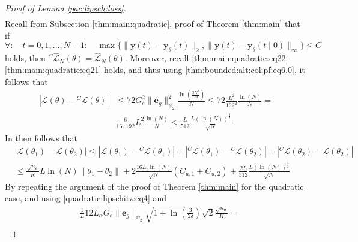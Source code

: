 \documentclass{article}
\newcommand{\e}{\mathbf{e}}
\newcommand{\y}{\mathbf{y}}
\begin{document}
\begin{proof}[Proof of Lemma \ref{pac:lipsch:loss}]
\begin{align*}
    \end{align*}
    Recall from Subsection \ref{thm:main:quadratic}, proof of Theorem \ref{thm:main} that 
    if 
    \[
         \forall: \quad   t=0,1,\ldots,N-1: \quad  \max\{\|\y(t)-\y_{\theta}(t)\|_2, \|\y(t)-\y_{\theta}(t \mid 0)\|_\infty\} \le C
    \]
   holds, then ${}^C \hat{\mathcal{L}}_N(\theta)=\hat{\mathcal{L}}_N(\theta)$.
   Moreover, recall \eqref{thm:main:quadratic:eq22}-\eqref{thm:main:quadratic:eq21} holds, and thus
   using \eqref{thm:bounded:alt:col:pf:eq6.0}, it follows that
   \begin{equation}
  \label{quadratic:lipschitz:eq04}
   \begin{aligned}
       \left|\mathcal{L}(\theta)-{}^C\mathcal{L}(\theta)\right| & \le 72G_e^2\|\e_g\|_{\psi_2}^2\frac{\ln\left(\frac{3N^2}{2\delta}\right)}{N} \le 72 \frac{L^2}{192^2} \frac{\ln(N)}{N} = \\
       & \frac{6}{16 \cdot 192} L^2 \frac{\ln(N)}{N} \le  \frac{L}{512} \frac{L(\ln(N))^{\frac{3}{2}}}{\sqrt{N}}
   \end{aligned}
  \end{equation}
  In then follows that
  \begin{equation}
  \label{quadratic:lipschitz:eq4}
   \begin{aligned}
       & \left|\mathcal{L}(\theta_1)-\mathcal{L}(\theta_2)\right| \le 
       \left|\mathcal{L}(\theta_1)-{}^C\mathcal{L}(\theta_1)\right| + \left|{}^C\mathcal{L}(\theta_1)-{}^C\mathcal{L}(\theta_2)\right| + \left|{}^C\mathcal{L}(\theta_2)-\mathcal{L}(\theta_2)\right| \\
       & \le \frac{\sqrt{n_\e}}{K} L\ln(N) \|\theta_1 - \theta_2\|
          + 2\frac{16L_{\ell}\ln(N)}{\sqrt{N}}\left(C_{u,1} + C_{u,2}\right) + \frac{2L}{512} \frac{L(\ln(N))^{\frac{3}{2}}}{\sqrt{N}}
   \end{aligned}
  \end{equation}
   By repeating the argument of the proof of Theorem \ref{thm:main} for the quadratic case,
   and using \eqref{quadratic:lipschitz:eq4} and 
   \begin{align*}
     & \frac{1}{L} 12 L_{\alpha}G_{e} \|\e_g\|_{\psi_2} \sqrt{1+\ln\left(\frac{3}{2\delta}\right)}\sqrt{2}\frac{\sqrt{n_\e}}{K}= \\

\end{align*}
\end{proof}
\end{document}
